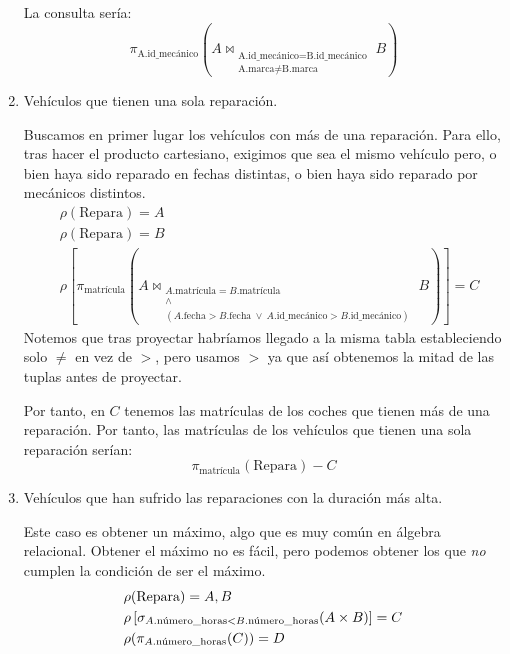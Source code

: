 \begin{ejercicio}
\begin{enumerate}
        La consulta sería:
        \begin{equation*}
            \pi_{\text{A.id\_mecánico}}\left(A \bowtie_{\substack{\text{A.id\_mecánico}= \text{B.id\_mecánico}\\\text{A.marca}\neq \text{B.marca}}} B\right)
        \end{equation*}

        \item Vehículos que tienen una sola reparación.
        
        Buscamos en primer lugar los vehículos con más de una reparación.
        Para ello, tras hacer el producto cartesiano, exigimos que sea el mismo vehículo pero, o bien haya sido reparado en fechas distintas, o bien haya sido reparado por mecánicos distintos.
        \begin{align*}
            &\rho(\text{Repara}) = A\\
            &\rho(\text{Repara}) = B\\
            &\rho\left[\pi_{\text{matrícula}}\left(A\bowtie_{\substack{A.\text{matrícula}=B.\text{matrícula}\\\land \\
            (A.\text{fecha} > B.\text{fecha} ~ \lor ~  A.\text{id\_mecánico} > B.\text{id\_mecánico})
            }} B\right)\right]=C
        \end{align*}
        Notemos que tras proyectar habríamos llegado a la misma tabla estableciendo solo $\neq$ en vez de $>$, pero usamos $>$ ya que así obtenemos la mitad de las tuplas antes de proyectar.

        Por tanto, en $C$ tenemos las matrículas de los coches que tienen más de una reparación.
        Por tanto, las matrículas de los vehículos que tienen una sola reparación serían:
        \begin{equation*}
            \pi_{\text{matrícula}}(\text{Repara})-C
        \end{equation*}


        \item Vehículos que han sufrido las reparaciones con la duración más alta.
        
        Este caso es obtener un máximo, algo que es muy común en álgebra relacional. Obtener el máximo no es fácil,
        pero podemos obtener los que \emph{no} cumplen la condición de ser el máximo.
        \begin{align*}
            & \rho(\text{Repara}) = A,B \\
            & \rho\left[\sigma_{A.\text{número\_horas} < B.\text{número\_horas}}(A \times B)\right] = C \\
            & \rho(\pi_{A.\text{\text{número\_horas}}}(C)) = D
        \end{align*}


\end{enumerate}
\end{ejercicio}
